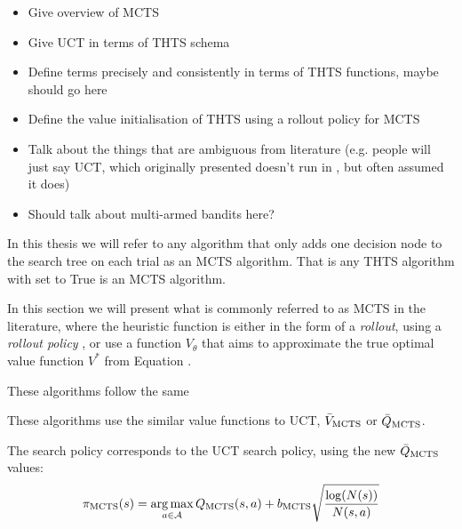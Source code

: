         \begin{itemize}
            \item Give overview of MCTS
            \item Give UCT in terms of THTS schema 
            \item Define terms precisely and consistently in terms of THTS functions, maybe \mctsmode\ewe should go here
            \item Define the value initialisation of THTS using a rollout policy for MCTS
            \item Talk about the things that are ambiguous from literature (e.g. people will just say UCT, which originally presented doesn't run in \mctsmode, but often assumed it does)
            \item Should talk about multi-armed bandits here?
        \end{itemize}




        In this thesis we will refer to any algorithm that only adds one decision node to the search tree on each trial as an MCTS algorithm. That is any THTS algorithm with \mctsmode set to True is an MCTS algorithm. 

        In this section we will present what is commonly referred to as MCTS in the literature, where the heuristic function is either in the form of a \textit{rollout}, using a \textit{rollout policy} , or use a function $V_\theta$ that aims to approximate the true optimal value function $V^*$ from Equation  .

        These algorithms follow the same 

        These algorithms use the similar value functions to UCT, $\bar{V}_{{\textnormal{MCTS}}}$ or $\bar{Q}_{{\textnormal{MCTS}}}$. 

        The search policy corresponds to the UCT search policy, using the new $\bar{Q}_{{\textnormal{MCTS}}}$ values:
        \begin{align}
            \pi_{{\textnormal{MCTS}}}(s) = \operatorname*{arg\,max}_{a\in\mathcal{A}} Q_{{\textnormal{MCTS}}}(s,a) + b_{{\textnormal{MCTS}}} \sqrt{\frac{\log(N(s))}{N(s,a)}} 
        \end{align}

